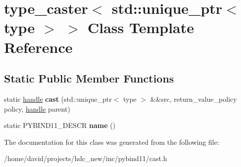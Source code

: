 \hypertarget{classtype__caster_3_01std_1_1unique__ptr_3_01type_01_4_01_4}{}\section{type\+\_\+caster$<$ std\+:\+:unique\+\_\+ptr$<$ type $>$ $>$ Class Template Reference}
\label{classtype__caster_3_01std_1_1unique__ptr_3_01type_01_4_01_4}
\subsection*{Static Public Member Functions}
\begin{DoxyCompactItemize}
\item 
static \hyperlink{classhandle}{handle} {\bfseries cast} (std\+::unique\+\_\+ptr$<$ type $>$ \&\&src, return\+\_\+value\+\_\+policy policy, \hyperlink{classhandle}{handle} parent)\hypertarget{classtype__caster_3_01std_1_1unique__ptr_3_01type_01_4_01_4_a157f57fb31e0f6e0a35576f4e06b6ab3}{}\label{classtype__caster_3_01std_1_1unique__ptr_3_01type_01_4_01_4_a157f57fb31e0f6e0a35576f4e06b6ab3}

\item 
static P\+Y\+B\+I\+N\+D11\+\_\+\+D\+E\+S\+CR {\bfseries name} ()\hypertarget{classtype__caster_3_01std_1_1unique__ptr_3_01type_01_4_01_4_aa9d7acf2093846ee332bb99167814e10}{}\label{classtype__caster_3_01std_1_1unique__ptr_3_01type_01_4_01_4_aa9d7acf2093846ee332bb99167814e10}

\end{DoxyCompactItemize}


The documentation for this class was generated from the following file\+:\begin{DoxyCompactItemize}
\item 
/home/david/projects/hdc\+\_\+new/inc/pybind11/cast.\+h\end{DoxyCompactItemize}
